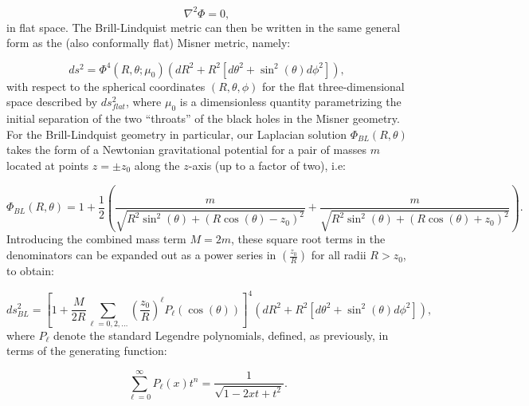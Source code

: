 \documentclass{article}
\begin{document}
\begin{equation}
\nabla^2 \Phi = 0,
\end{equation}
in flat space. The Brill-Lindquist metric can then be written in the same general form as the (also conformally flat) Misner metric\cite{misner3}, namely:

\begin{equation}
ds^2 = \Phi^4 \left( R, \theta ; \mu_0 \right) \left( dR^2 + R^2 \left[ d \theta^2 + \sin^2 \left( \theta \right) d \phi^2 \right] \right),
\end{equation}
with respect to the spherical coordinates ${\left( R, \theta, \phi \right)}$ for the flat three-dimensional space described by ${d s_{flat}^{2}}$, where ${\mu_0}$ is a dimensionless quantity parametrizing the initial separation of the two ``throats'' of the black holes in the Misner geometry. For the Brill-Lindquist geometry in particular, our Laplacian solution ${\Phi_{BL} \left( R, \theta \right)}$ takes the form of a Newtonian gravitational potential for a pair of masses $m$ located at points ${z = \pm z_0}$ along the $z$-axis (up to a factor of two), i.e:

\begin{equation}
\Phi_{BL} \left( R, \theta \right) = 1 + \frac{1}{2} \left( \frac{m}{\sqrt{R^2 \sin^2 \left( \theta \right) + \left( R \cos \left( \theta \right) - z_0 \right)^2}} + \frac{m}{\sqrt{R^2 \sin^2 \left( \theta \right) + \left( R \cos \left( \theta \right) + z_0 \right)^2}} \right).
\end{equation}
Introducing the combined mass term ${M = 2m}$, these square root terms in the denominators can be expanded out as a power series in ${\left( \frac{z_0}{R} \right)}$ for all radii ${R > z_0}$, to obtain:

\begin{equation}
d s_{BL}^{2} = \left[ 1 + \frac{M}{2R} \sum_{\ell = 0, 2, \dots} \left( \frac{z_0}{R} \right)^{\ell} P_{\ell} \left( \cos \left( \theta \right) \right) \right]^4 \left( d R^2 + R^2 \left[ d \theta^2 + \sin^2 \left( \theta \right) d \phi^2 \right] \right),
\end{equation}
where ${P_{\ell}}$ denote the standard Legendre polynomials, defined, as previously, in terms of the generating function\cite{arfken}:

\begin{equation}
\sum_{\ell = 0}^{\infty} P_{\ell} \left( x \right) t^n = \frac{1}{\sqrt{1 - 2 xt + t^2}}.
\end{equation}
\end{document}
